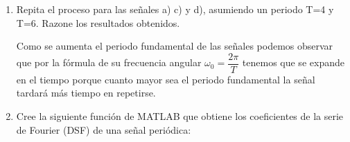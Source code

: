 \documentclass{article}
\begin{document}
\begin{enumerate}[leftmargin=*]
\begin{enumerate}[label=\alph*)]
\begin{lstlisting}
% Graficar la señal para 3 periodos
figure(1), plot([t-T t t+T], [x x x], "LineWidth", 1.5, "color", "#007AFF");
xlabel('Tiempo (t)');
ylabel('x(t)');
title('$x(t)=\begin{cases}2 & 0<|t|<0.5\\0&0.5<|t|<1\end{cases}$','Interpreter','latex');
		\end{lstlisting}
		\item $x(t)=0.8\sin(2\pi t)+0.6\cos(\pi t)-0.2\sin\left(3\pi t+\dfrac{\pi}{4}\right)$
\begin{lstlisting}
x = 0.8*sin(2*pi*t) + 0.6*cos(pi*t) - 0.2*sin(3*pi*t + pi/4);
figure(2), plot([t-T t t+T], [x x x], "LineWidth", 1.5, "color", "#007AFF");
xlabel('Tiempo (t)');
ylabel('x(t)');
title('$x(t)=0.8\sin(2\pi t)+0.6\cos(\pi t)-0.2\sin\left(3\pi t+\dfrac{\pi}{4}\right)$','Interpreter','latex');
\end{lstlisting}
		\item $x(t)=\begin{cases}
			2t, & 0<t<1\\
			-2t,&-1\le t\le0
		\end{cases}$
		\item $x(t)=0.5\delta(t),\:-1\le t<1$
		\item $x(t)=\left|\sin\left(\dfrac{\pi}{2}t\right)\right|$
		\item $x(t)=e^{j2\pi t}+e^{-j3\pi t}$
	\end{enumerate}
	
	Ayuda: la señal (a) se obtiene mediante los comandos
	\begin{lstlisting}
T = 2; dt = 0.001; t = -T/2:dt:T/2-dt;
x = zeros(1, length(t));
ti = find(abs(t)<=0.5); x(ti) = 2;
ti = find(abs(t)> 0.5); x(ti) = 0;
figure, plot([t-T t t+T], [x x x])
	\end{lstlisting}
	\item Repita el proceso para las señales a) c) y d), asumiendo un periodo T=4 y T=6. Razone los resultados obtenidos.
	
	Como se aumenta el periodo fundamental de las señales podemos observar que por la fórmula de su frecuencia angular $\omega_0=\dfrac{2\pi}{T}$ tenemos que se expande en el tiempo porque cuanto mayor sea el periodo fundamental la señal tardará más tiempo en repetirse.
	
	\item Cree la siguiente función de MATLAB que obtiene los coeficientes de la serie de Fourier (DSF) de una señal periódica:
	

\end{enumerate}
\end{document}

